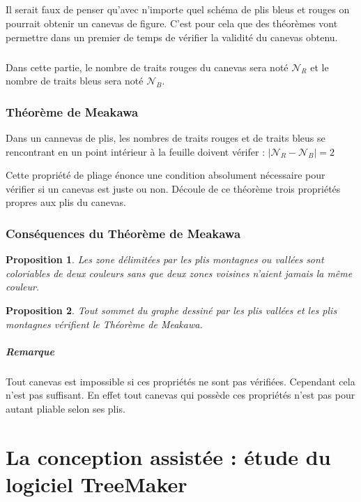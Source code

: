 \documentclass[a4paper,12pt,french]{report}
\newtheorem{proposition}{Proposition}[section]
\begin{document}
		\paragraph{} Il serait faux de penser qu’avec n’importe quel schéma de plis bleus et rouges on pourrait obtenir un canevas de figure. C’est pour cela que des théorèmes vont permettre dans un premier de temps de vérifier la validité du canevas obtenu.

		\paragraph{} Dans cette partie, le nombre de traits rouges du canevas sera noté \( \mathscr{N}_{R}\) et le nombre de traits bleus sera noté \(\mathscr{N}_{B}\).

		\subsection{Théorème de Meakawa}

		\begin{theorem}
			Dans un cannevas de plis, les nombres de traits rouges et  de traits bleus se rencontrant en un point intérieur à la feuille doivent vérifer : \(|\mathscr{N}_{R}-\mathscr{N}_{B}|=2\)
		\end{theorem}
      
      Cette propriété de pliage énonce une condition absolument nécessaire pour vérifier si un canevas est juste ou non.
      Découle de ce théorème trois propriétés propres aux plis du canevas.
      
		\subsection{Conséquences du Théorème de Meakawa}

		\begin{proposition}
			Les zone délimitées par les plis \emph{montagnes} ou \emph{vallées} sont coloriables de deux couleurs sans que deux zones voisines n’aient jamais la même couleur.
		\end{proposition} 
		\begin{proposition}
			Tout sommet du graphe dessiné par les plis \emph{vallées} et 
			les plis \emph{montagnes} vérifient le Théorème de Meakawa.
		\end{proposition}

		\paragraph{Remarque}
		Tout canevas est impossible si ces propriétés ne sont pas 
		vérifiées. Cependant cela n'est pas suffisant. En effet tout 
		canevas qui possède ces propriétés n'est pas pour autant 
		pliable selon ses plis.

      

    






\chapter{La conception assistée : étude du logiciel TreeMaker}
\end{document}
